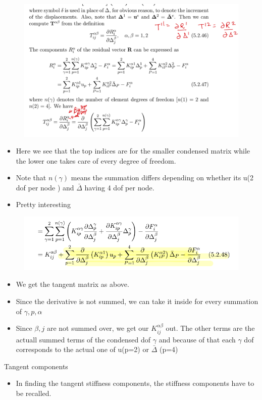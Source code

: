 	\begin{frame}
		\begin{figure}
			\centering
			\includegraphics[width=0.8\linewidth]{Figure/2}
			\label{fig:2}
		\end{figure}
		\begin{itemize}
			\item Here we see that the top indices are for the smaller condensed matrix while the lower one takes care of every degree of freedom. 
			\item Note that $n(\gamma)$ means the summation differs depending on whether its u(2 dof per node ) and $\bar{\Delta}$ having 4 dof per node. 
			\item Pretty interesting
		\end{itemize}
	\end{frame}


	\begin{frame}
		\begin{figure}
			\centering
			\includegraphics[width=0.8\linewidth]{Figure/3}
			\label{fig:3}
		\end{figure}
		\begin{itemize}
			\item We get the tangent matrix as above. 
			\item Since the derivative is not summed, we can take it inside for every summation of $\gamma, p, \alpha$ 
			\item Since $\beta, j$ are not summed over, we get our $K^{\alpha \beta}_{ij}$ out. The other terms are the actuall summed terms of the condensed dof $\gamma$ and because of that each $\gamma$ dof corresponds to the actual one of u(p=2) or $\bar{\Delta }$ (p=4)

			
		\end{itemize}
	\end{frame}


	\begin{frame}{Tangent components}
		\begin{itemize}
			\item In finding the tangent stiffness components, the stiffness components have to be recalled. 
			
		\end{itemize}
	\end{frame}
